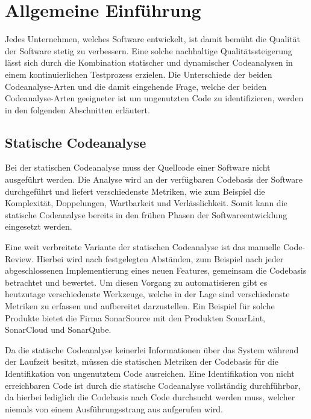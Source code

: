 \chapter{Allgemeine Einführung\label{chap2:Zweites-Kapitel}}

Jedes Unternehmen, welches Software entwickelt, ist damit bemüht die Qualität der Software stetig zu verbessern. Eine solche nachhaltige Qualitätssteigerung lässt sich durch die Kombination statischer und dynamischer Codeanalysen in einem kontinuierlichen Testprozess erzielen. Die Unterschiede der beiden Codeanalyse-Arten und die damit eingehende Frage, welche der beiden Codeanalyse-Arten geeigneter ist um ungenutzten Code zu identifizieren, werden in den folgenden Abschnitten erläutert.

\section{Statische Codeanalyse\label{sec2.1:Unterpunkt-1}}

Bei der statischen Codeanalyse muss der Quellcode einer Software nicht ausgeführt werden. Die Analyse wird an der verfügbaren Codebasis der Software durchgeführt und liefert verschiedenste Metriken, wie zum Beispiel die Komplexität, Doppelungen, Wartbarkeit und Verlässlichkeit. Somit kann die statische Codeanalyse bereits in den frühen Phasen der Softwareentwicklung eingesetzt werden. \cite{SonarSourceS.A.2021}

Eine weit verbreitete Variante der statischen Codeanalyse ist das manuelle Code-Review. Hierbei wird nach festgelegten Abständen, zum Beispiel nach jeder abgeschlossenen Implementierung eines neuen Features, gemeinsam die Codebasis betrachtet und bewertet. Um diesen Vorgang zu automatisieren gibt es heutzutage verschiedenste Werkzeuge, welche in der Lage sind verschiedenste Metriken zu erfassen und aufbereitet darzustellen. Ein Beispiel für solche Produkte bietet die Firma SonarSource mit den Produkten \glqq SonarLint\grqq{}, \glqq SonarCloud\grqq{} und \glqq SonarQube\grqq{}. \cite{SonarSourceS.A.2021}

Da die statische Codeanalyse keinerlei Informationen über das System während der Laufzeit besitzt, müssen die statischen Metriken der Codebasis für die Identifikation von ungenutztem Code ausreichen. Eine Identifikation von \glqq nicht erreichbaren Code\grqq{} ist durch die statische Codeanalyse vollständig durchführbar, da hierbei lediglich die Codebasis nach Code durchsucht werden muss, welcher niemals von einem Ausführungsstrang aus aufgerufen wird.

